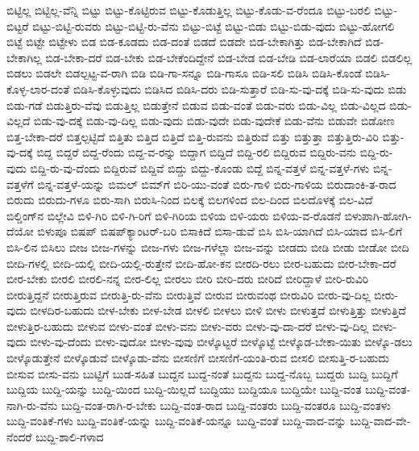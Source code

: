 {ಬಿಟ್ಟಿಲ್ಲ
ಬಿಟ್ಟಿಲ್ಲ-ವೆನ್ನಿ
ಬಿಟ್ಟು
ಬಿಟ್ಟು-ಕೊಟ್ಟಿರುವ
ಬಿಟ್ಟು-ಕೊಡುತ್ತಿಲ್ಲ
ಬಿಟ್ಟು-ಕೊಡು-ವ-ರೆಂದೂ
ಬಿಟ್ಟು-ಬರಲಿ
ಬಿಟ್ಟು-ಬಿಟ್ಟರೆ
ಬಿಟ್ಟು-ಬಿಟ್ಟಿ-ರುವರು
ಬಿಟ್ಟು-ಬಿಟ್ಟಿ-ರು-ವೆನು
ಬಿಟ್ಟು-ಬಿಟ್ಟೆ
ಬಿಟ್ಟು-ಬಿಡು
ಬಿಟ್ಟು-ಬಿಡು-ವುದು
ಬಿಟ್ಟು-ಹೋಗಲಿ
ಬಿಟ್ಟೆ
ಬಿಟ್ಟೇ
ಬಿಟ್ಟೇಳು
ಬಿಡ
ಬಿಡ-ಕೂಡದು
ಬಿಡ-ದಂತೆ
ಬಿಡದೆ
ಬಿಡದೇ
ಬಿಡ-ಬೇಕಾಗಿತ್ತು
ಬಿಡ-ಬೇಕಾಗಿದೆ
ಬಿಡ-ಬೇಕಾಗಿಲ್ಲ
ಬಿಡ-ಬೇಕಾ-ದರೆ
ಬಿಡ-ಬೇಕು
ಬಿಡ-ಬೇಕೆಂದಿದ್ದೇನೆ
ಬಿಡ-ಬೇಡ
ಬಿಡ-ಬೇಡಿ
ಬಿಡ-ಲಾರೆಯಾ
ಬಿಡಲಿ
ಬಿಡಲಿಲ್ಲ
ಬಿಡಲು
ಬಿಡಲೇ
ಬಿಡಲ್ಪಟ್ಟ-ವ-ರಾಗಿ
ಬಿಡಿ
ಬಿಡಿ-ಗಾ-ಸನ್ನೂ
ಬಿಡಿ-ಗಾಸೂ
ಬಿಡಿ-ಸಲಿ
ಬಿಡಿಸಿ
ಬಿಡಿಸಿ-ಕೊಂಡೆ
ಬಿಡಿಸಿ-ಕೊಳ್ಳ-ಲಾರ-ದಂತೆ
ಬಿಡಿಸಿ-ಕೊಳ್ಳುವುದು
ಬಿಡಿಸಿದ
ಬಿಡಿಸಿ-ದರು
ಬಿಡಿ-ಸುತ್ತಾರೆ
ಬಿಡಿ-ಸು-ವು-ದಕ್ಕೆ
ಬಿಡಿ-ಸು-ವುದು
ಬಿಡು
ಬಿಡು-ಗಡೆ
ಬಿಡುತ್ತಿರು-ವೆವು
ಬಿಡುತ್ತಿಲ್ಲ
ಬಿಡುತ್ತೇನೆ
ಬಿಡುವ
ಬಿಡು-ವಂತೆ
ಬಿಡು-ವರು
ಬಿಡು-ವಿಲ್ಲ
ಬಿಡು-ವಿಲ್ಲದ
ಬಿಡು-ವಿಲ್ಲದೆ
ಬಿಡು-ವು-ದಕ್ಕೆ
ಬಿಡು-ವು-ದಿಲ್ಲ
ಬಿಡು-ವುದು
ಬಿಡು-ವುದೇ
ಬಿಡು-ವುದೇಕೆ
ಬಿಡು-ವೆನು
ಬಿಡುವೇ
ಬಿಡೋಣ
ಬಿತ್ತ-ಬೇಕಾ-ದರೆ
ಬಿತ್ತಲ್ಪಟ್ಟಿದೆ
ಬಿತ್ತಿತು
ಬಿತ್ತಿದ
ಬಿತ್ತಿದೆ
ಬಿತ್ತಿ-ರುವನು
ಬಿತ್ತಿರುವೆ
ಬಿತ್ತು
ಬಿತ್ತುತ್ತಾ
ಬಿತ್ತುತ್ತಿರು-ವಿರಿ
ಬಿತ್ತು-ವು-ದಕ್ಕೆ
ಬಿದ್ದ
ಬಿದ್ದರೆ
ಬಿದ್ದ-ರೆಂದು
ಬಿದ್ದ-ವ-ರನ್ನು
ಬಿದ್ದಾಗ
ಬಿದ್ದಿದೆ
ಬಿದ್ದಿ-ರಲಿ
ಬಿದ್ದಿರುವ
ಬಿದ್ದಿರು-ವನು
ಬಿದ್ದಿ-ರು-ವುದು
ಬಿದ್ದಿ-ರು-ವು-ದೆಂದು
ಬಿದ್ದಿರುವೆ
ಬಿದ್ದಿವೆ
ಬಿದ್ದು
ಬಿದ್ದು-ಕೊಂಡು
ಬಿದ್ದೆ
ಬಿನ್ನ-ವತ್ತಳೆ
ಬಿನ್ನ-ವತ್ತಳೆ-ಗಳು
ಬಿನ್ನ-ವತ್ತಳೆಗೆ
ಬಿನ್ನ-ವತ್ತಳೆ-ಯನ್ನು
ಬಿಮಲ್
ಬಿಮ್‌ಗೆ
ಬಿರಿ-ಯು-ವಂತೆ
ಬಿರು-ಗಾಳಿ
ಬಿರು-ಗಾಳಿಯ
ಬಿರುದಾಂಕಿ-ತ-ರಾದ
ಬಿರುದು
ಬಿರುದು-ಗಳೂ
ಬಿರು-ಸಾಗಿ
ಬಿರುಸಿ-ನಿಂದ
ಬಿಲಕ್ಕೆ
ಬಿಲಗಳಿಂದ
ಬಿಲ-ದಿಂದ
ಬಿಲದೊಳಕ್ಕೆ
ಬಿಲ-ವಿದೆ
ಬಿಲ್ಡಿಂಗ್‌ನ
ಬಿಲ್ಲೇವಿ
ಬಿಳಿ-ಗಿರಿ
ಬಿಳಿ-ಗಿ-ರಿಗೆ
ಬಿಳಿ-ಗಿರಿಯ
ಬಿಳಿಯ
ಬಿಳಿ-ಯರು
ಬಿಳಿಯ-ವ-ರೊಡನೆ
ಬಿಳುಪಾಗಿ-ಹೋಗಿ-ದೆಯೋ
ಬಿಳುಪೂ
ಬಿಷಪ್
ಬಿಷಪ್‌ಕ್ಯಾಂಟರ್‌-ಬರಿ
ಬಿಸಾಕಿದೆ
ಬಿಸಾ-ಡುವೆ
ಬಿಸಿ
ಬಿಸಿ-ಯಾಗಿದೆ
ಬಿಸಿ-ಯಾದ
ಬಿಸಿ-ಲಿಗೆ
ಬಿಸಿ-ಲಿನ
ಬಿಸಿಲು
ಬೀಜ
ಬೀಜ-ಗಳನ್ನು
ಬೀಜ-ಗಳು
ಬೀಜ-ಗಳೆಲ್ಲಾ
ಬೀಜ-ವನ್ನು
ಬೀಡದು
ಬೀಡಿ
ಬೀಡು
ಬೀಡೋ
ಬೀದಿ
ಬೀದಿ-ಗಳಲ್ಲಿ
ಬೀದಿ-ಯಲ್ಲಿ
ಬೀದಿ-ಯಲ್ಲಿ-ರುತ್ತೇನೆ
ಬೀದಿ-ಹೋ-ಕನ
ಬೀರದಿ-ರಲು
ಬೀರ-ಬಹುದು
ಬೀರ-ಬೇಕಾ-ದರೆ
ಬೀರ-ಬೇಕು
ಬೀರಲಿ
ಬೀರಲಿ-ನನ್ನ
ಬೀರ-ಲಿಲ್ಲ
ಬೀರಲು
ಬೀರಿ
ಬೀರಿ-ದರು
ಬೀರಿದೆ
ಬೀರಿದ್ದಾಳೆ
ಬೀರಿ-ರುವಿರಿ
ಬೀರುತ್ತಿದ್ದನೆ
ಬೀರುತ್ತಿರುವ
ಬೀರುತ್ತಿ-ರು-ವೆನು
ಬೀರುತ್ತಿವೆ
ಬೀರುವ
ಬೀರುವಂಥ
ಬೀರುವಿರಿ
ಬೀರು-ವು-ದಿಲ್ಲ
ಬೀರು-ವುದು
ಬೀಳದಿರ-ಬಹುದು
ಬೀಳ-ಬೇಕು
ಬೀಳ-ಬೇಡ
ಬೀಳಲಿ
ಬೀಳಲು
ಬೀಳಿ
ಬೀಳು
ಬೀಳುತ್ತದೆ
ಬೀಳುತ್ತಿತ್ತು
ಬೀಳುತ್ತಿದೆ
ಬೀಳುತ್ತಿರ-ಬಹುದು
ಬೀಳುವ
ಬೀಳು-ವಂತೆ
ಬೀಳು-ವನು
ಬೀಳು-ವರು
ಬೀಳು-ವು-ದಾ-ದರೆ
ಬೀಳು-ವು-ದಿಲ್ಲ
ಬೀಳು-ವುದು
ಬೀಳು-ವು-ದೆಂದು
ಬೀಳು-ವುದೋ
ಬೀಳು-ವುವು
ಬೀಳ್ಕೊಟ್ಟರೆ
ಬೀಳ್ಕೊಟ್ಟೆ
ಬೀಳ್ಕೊಡ-ಬೇಕಾ-ಯಿತು
ಬೀಳ್ಕೊ-ಡಲು
ಬೀಳ್ಕೊಡುತ್ತೇನೆ
ಬೀಳ್ಕೊಡುವೆ
ಬೀಳ್ಕೊಡು-ವೆನು
ಬೀಸಣಿಗೆ
ಬೀಸಣಿಗೆ-ಯಂತಿ-ರುವ
ಬೀಸಲಿ
ಬೀಸುತ್ತಿ-ರ-ಬಹುದು
ಬೀಸುವ
ಬೀಸು-ವನು
ಬುಟ್ಟಿಗೆ
ಬುಡ-ಸಹಿತ
ಬುದ್ದನ
ಬುದ್ದ-ನಂತೆ
ಬುದ್ದನು
ಬುದ್ದ-ನೊಬ್ಬ
ಬುದ್ದರು
ಬುದ್ದಿ
ಬುದ್ದಿಗೆ
ಬುದ್ದಿಯ
ಬುದ್ದಿ-ಯನ್ನು
ಬುದ್ದಿ-ಯಿಂದ
ಬುದ್ದಿ-ಯಿಲ್ಲದೆ
ಬುದ್ದಿಯು
ಬುದ್ದಿಯೂ
ಬುದ್ದಿಯೇ
ಬುದ್ದಿ-ವಂತ
ಬುದ್ದಿ-ವಂತ-ನಾಗಿ-ರು-ವೆನು
ಬುದ್ದಿ-ವಂತ-ರಾಗಿ-ರ-ಬೇಕು
ಬುದ್ದಿ-ವಂತ-ರಾದ
ಬುದ್ದಿ-ವಂತರು
ಬುದ್ದಿ-ವಂತರೂ
ಬುದ್ದಿ-ವಂತಳು
ಬುದ್ದಿ-ವಂತಿಕೆ-ಗಳು
ಬುದ್ದಿ-ವಂತಿಕೆ-ಯನ್ನು
ಬುದ್ದಿ-ವಂತಿಕೆ-ಯನ್ನೂ
ಬುದ್ದಿ-ವಂತೆ
ಬುದ್ದಿ-ವಾದ-ವನ್ನು
ಬುದ್ದಿ-ವಾದ-ವೇ-ನೆಂದರೆ
ಬುದ್ದಿ-ಶಾಲಿ-ಗಳಾದ
}
